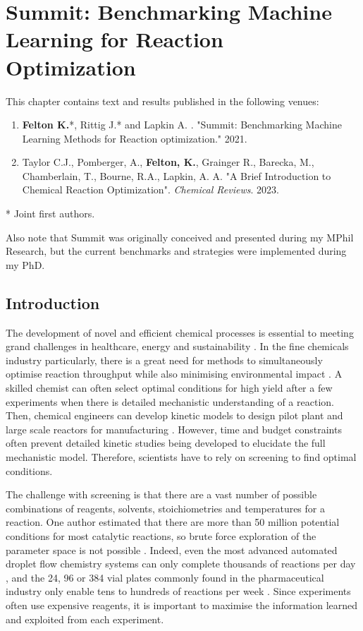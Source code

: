 \chapter{Summit: Benchmarking Machine Learning for Reaction Optimization}\label{ch:summit}

This chapter contains text and results published in the following venues:

\begin{enumerate}
\item \textbf{Felton K.}*, Rittig J.* and Lapkin A. . "Summit: Benchmarking Machine Learning Methods for Reaction optimization." 2021.
\item Taylor C.J., Pomberger, A., \textbf{Felton, K.}, Grainger R., Barecka, M., Chamberlain, T., Bourne, R.A., Lapkin, A. A. "A Brief Introduction to Chemical Reaction Optimization". \textit{Chemical Reviews}. 2023.
\end{enumerate}

* Joint first authors.

Also note that Summit was originally conceived and presented during my MPhil Research, but the current benchmarks and strategies were implemented during my PhD.


\section{Introduction}
The development of novel and efficient chemical processes is essential to meeting grand challenges in healthcare, energy and sustainability \cite{Sheldon2018,Rogers2019}. In the fine chemicals industry particularly, there is a great need for methods to simultaneously optimise reaction throughput while also minimising environmental impact \cite{Schweidtmann2018}. A skilled chemist can often select optimal conditions for high yield after a few experiments when there is detailed mechanistic understanding of a reaction. Then, chemical engineers can develop kinetic models to design pilot plant and large scale reactors for manufacturing \cite{Roberts2008}. However, time and budget constraints often prevent detailed kinetic studies being developed to elucidate the full mechanistic model. Therefore, scientists have to rely on screening to find optimal conditions. 

The challenge with screening is that there are a vast number of possible combinations of reagents, solvents, stoichiometries and temperatures for a reaction. One author estimated that there are more than 50 million potential conditions for most catalytic reactions, so brute force exploration of the parameter space is not possible \cite{Murray2013}. Indeed, even the most advanced automated droplet flow chemistry systems can only complete thousands of reactions per day \cite{Perera2018}, and the 24, 96 or 384 vial plates commonly found in the pharmaceutical industry only enable tens to hundreds of reactions per week \cite{BuitragoSantanilla2015, Shevlin2017, Mennen2019}. Since experiments often use expensive reagents, it is important to maximise the information learned and exploited from each experiment.

